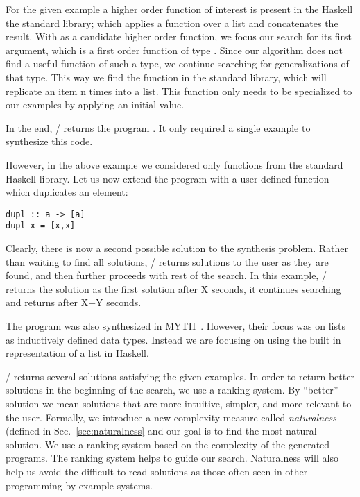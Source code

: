 For the given example a higher order function of interest is present in the Haskell the standard library;  which applies a function over a list and concatenates the result.
With  as a candidate higher order function, we focus
 our search for its first argument, which is a first order function of type .
Since our algorithm does not find a useful function of such a type, we continue searching for generalizations of that type.
This way we find the function  in the standard library, which will replicate an item n times into a list.
This function only needs to be specialized to our examples by applying an initial value.

In the end, \ourTool/ returns the program . It only required a single example to synthesize this code.

However, in the above example we considered only functions from the standard Haskell library. Let us now extend the program with a user defined function  which duplicates an element:
\begin{lstlisting}
dupl :: a -> [a]
dupl x = [x,x]
\end{lstlisting}

Clearly, there is now a second possible solution to the synthesis problem.
Rather than waiting to find all solutions, \ourTool/ returns solutions to the user as they are found, and then further proceeds with rest of the search.
In this example, \ourTool/ returns the solution  as the first solution after X seconds, it continues searching and returns  after X+Y seconds.

The  program was also synthesized in MYTH~\cite{Osera:2015}. However, their focus was on lists as inductively defined data types. Instead we 
are focusing on using the built in representation of a list in Haskell.

\ourTool/ returns several solutions satisfying the given examples. In
 order to return better solutions in the beginning of the search, we use a ranking system. By ``better'' solution we mean solutions that are more intuitive, simpler, and more relevant to the user. Formally, we introduce a new complexity measure called \textit{naturalness} (defined in 
Sec.~\ref{sec:naturalness} and our goal is to find the most natural solution. We use a ranking system based on the complexity of the 
generated programs. The ranking system helps to guide our search.
Naturalness will also help us avoid the difficult to read solutions as those often seen in other programming-by-example systems.




